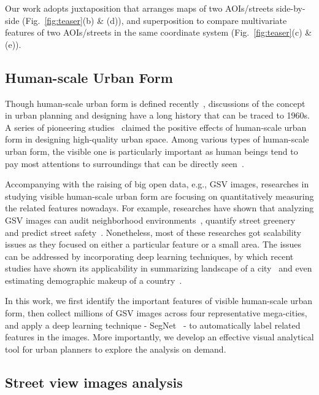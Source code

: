 Our work adopts juxtaposition that arranges maps of two AOIs/streets side-by-side (Fig.~\ref{fig:teaser}(b) \& (d)), and superposition to compare multivariate features of two AOIs/streets in the same coordinate system (Fig.~\ref{fig:teaser}(c) \& (e)).

\subsection{Human-scale Urban Form}
Though human-scale urban form is defined recently~\cite{long_2016_human-scale}, discussions of the concept in urban planning and designing have a long history that can be traced to 1960s.
A series of pioneering studies~\cite{jacobs_1961_life, gehl_1971_life} claimed the positive effects of human-scale urban form in designing high-quality urban space.
Among various types of human-scale urban form, the visible one is particularly important as human beings tend to pay most attentions to surroundings that can be directly seen~\cite{gehl_1971_life}. 

Accompanying with the raising of big open data, e.g., GSV images, researches in studying visible human-scale urban form are focusing on quantitatively measuring the related features nowadays. 
For example, researches have shown that analyzing GSV images can audit neighborhood environments~\cite{rundle_2011_using}, quantify street greenery~\cite{li_2015_accessing} and predict street safety~\cite{Naik_2014_streetscore}.
Nonetheless, most of these researches got scalability issues as they focused on either a particular feature or a small area.
The issues can be addressed by incorporating deep learning techniques, by which recent studies have shown its applicability in summarizing landscape of a city~\cite{doersch2015makes} and even estimating demographic makeup of a country~\cite{gebru2017using}.

\vspace{2mm}
In this work, we first identify the important features of visible human-scale urban form, then collect millions of GSV images across four representative mega-cities, and apply a deep learning technique - SegNet~\cite{Badrinarayanan_2015_segnet} - to automatically label related features in the images.
More importantly, we develop an effective visual analytical tool for urban planners to explore the analysis on demand.

\fi

\subsection{Street view images analysis}

